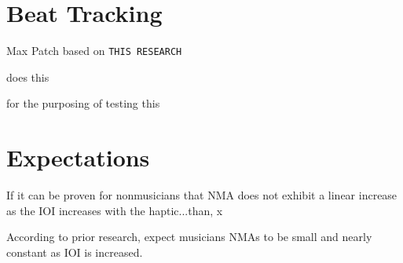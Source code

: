 \section{Beat Tracking}

Max Patch based on \verb!THIS RESEARCH! 

does this

for the purposing of testing this

\section{Expectations}

If it can be proven for nonmusicians that NMA does not exhibit a linear increase as the IOI increases with the haptic...than, x

According to prior research, expect musicians NMAs to be small and nearly constant as IOI is increased.\cite{repp2013sensorimotor,4}



